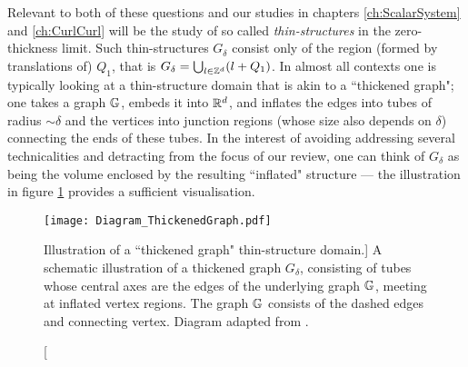 Relevant to both of these questions and our studies in chapters \ref{ch:ScalarSystem} and \ref{ch:CurlCurl} will be the study of so called \emph{thin-structures} in the zero-thickness limit.
Such thin-structures $G_{\delta}$ consist only of the region (formed by translations of) $Q_1$, that is $G_{\delta} = \bigcup_{l\in\mathbb{Z}^d}(l+Q_1)$.
In almost all contexts one is typically looking at a thin-structure domain that is akin to a ``thickened graph"; one takes a graph $\mathbb{G}$, embeds it into $\mathbb{R}^d$, and inflates the edges into tubes of radius $\sim\delta$ and the vertices into junction regions (whose size also depends on $\delta$) connecting the ends of these tubes.
In the interest of avoiding addressing several technicalities and detracting from the focus of our review, one can think of $G_{\delta}$ as being the volume enclosed by the resulting ``inflated" structure --- the illustration in figure \ref{fig:Diagram_ThickenedGraph} provides a sufficient visualisation.
\begin{figure}[b]
	\centering
	\texttt{[image: Diagram\_ThickenedGraph.pdf]}
	\caption[Illustration of a ``thickened graph" thin-structure domain.]{\label{fig:Diagram_ThickenedGraph} A schematic illustration of a thickened graph $G_{\delta}$, consisting of tubes whose central axes are the edges of the underlying graph $\mathbb{G}$, meeting at inflated vertex regions. The graph $\mathbb{G}$ consists of the dashed edges and connecting vertex. Diagram adapted from \cite[Figure 1]{exner2005convergence}.}
\end{figure}

